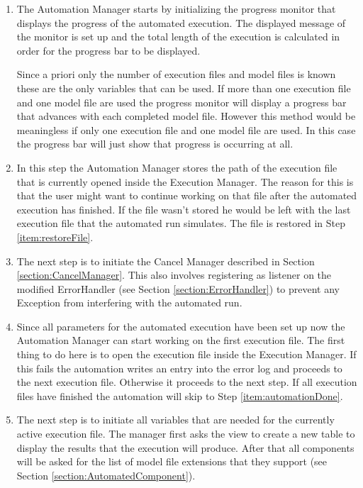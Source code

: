 \begin{enumerate}
 \item \label{item:initiateProgressMonitor} The Automation Manager starts by initializing the 
progress monitor that displays the progress of the automated execution. 
The displayed message of the monitor is set up and the total length of the execution is 
calculated in order for the progress bar to be displayed.

Since a priori only the number of execution files and model files is known these are the only
variables that can be used. If more than one execution file and one model file are used the 
progress monitor will display a progress bar that advances with each completed model file. 
However this method would be meaningless if only one execution file and one model file
are used. In this case the progress bar will just show that progress is occurring at all.

 \item \label{item:saveOpenedFile} In this step the Automation Manager stores the path
of the execution file that is currently opened inside the Execution Manager. The reason for this
is that the user might want to continue working on that file after the automated execution
has finished. If the file wasn't stored he would be left with the last execution file
that the automated run simulates. The file is restored in Step \ref{item:restoreFile}.

 \item \label{item:initiateCancelManager} The next step is to initiate the Cancel Manager
described in Section \ref{section:CancelManager}. This also involves registering as listener on the 
modified ErrorHandler (see Section \ref{section:ErrorHandler}) to prevent any Exception
from interfering with the automated run.

 \item \label{item:checkExecutionFile} Since all parameters for the automated execution
have been set up now the Automation Manager can start working on the first execution file. The first
thing to do here is to open the execution file inside the Execution Manager. If this fails the automation
writes an entry into the error log and proceeds to the next execution file. Otherwise it proceeds to the
next step. If all execution files have finished the automation will skip to Step \ref{item:automationDone}.

 \item \label{item:setupExecutionFile} The next step is to initiate all variables that are needed
for the currently active execution file. The manager first asks the view to create a new table to
display the results that the execution will produce. After that all components will be asked
for the list of model file extensions that they support (see Section \ref{section:AutomatedComponent}).


\end{enumerate}
